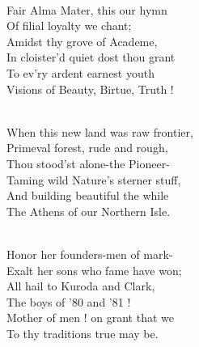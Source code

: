 \documentclass[10pt,b5j]{tarticle} %
\begin{document}
\vspace{1.5em} %
\newcommand{\linespace}{0.5em} %
\newcommand{\blocksize}{0.5\hsize} %
\newcommand{\itemmargin}{3em} %
\begin{enumerate} %
    \setlength{\itemindent}{\itemmargin} %
    \begin{minipage}[c]{\blocksize}
    
        \vspace{\linespace}
        \item~\\
        Fair Alma Mater, this our hymn\\
          Of filial loyalty we chant;\\
        Amidst thy grove of Academe,\\
          In cloister'd quiet dost thou grant\\
            To ev'ry ardent earnest youth\\
            Visions of Beauty, Birtue, Truth !
        
    \end{minipage}
    \begin{minipage}[c]{\blocksize}
        
        \vspace{\linespace}
        \item~\\
        When this new land was raw frontier,\\
          Primeval forest, rude and rough,\\
        Thou stood'st alone-the Pioneer-\\
          Taming wild Nature's sterner stuff,\\
            And building beautiful the while\\
            The Athens of our Northern Isle.
        
    \end{minipage}
    \begin{minipage}[c]{\blocksize}
        
        \vspace{\linespace}
        \item~\\
        Honor her founders-men of mark-\\
          Exalt her sons who fame have won;\\
        All hail to Kuroda and Clark,\\
          The boys of '80 and '81 !\\
            Mother of men ! on grant that we\\
            To thy traditions true may be.
        

\end{minipage}
\end{enumerate}
\end{document}
